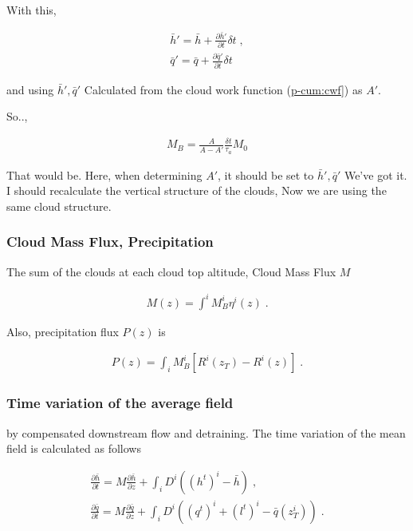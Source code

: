 With this,

\begin{eqnarray}
  \bar{h}'  =  \bar{h} + \frac{\partial \bar{h}'}{\partial t} \delta t \; , \\
  \bar{q}'  =  \bar{q} + \frac{\partial \bar{q}'}{\partial t} \delta t 
\end{eqnarray}

and using \(\bar{h}', \bar{q}'\) Calculated from the cloud work function
(\protect\hyperlink{p-cum:cwf}{p-cum:cwf{]}}) as \(A'\).

So..,

\begin{eqnarray}
  M_B = \frac{A}{A-A'} \frac{\delta t}{\tau_a} M_0 
\end{eqnarray}

That would be. Here, when determining \(A'\), it should be set to
\(\bar{h}', \bar{q}'\) We've got it. I should recalculate the vertical
structure of the clouds, Now we are using the same cloud structure.

\hypertarget{cloud-mass-flux-precipitation}{%
\subsubsection{Cloud Mass Flux,
Precipitation}\label{cloud-mass-flux-precipitation}}

The sum of the clouds at each cloud top altitude, Cloud Mass Flux \(M\)

\begin{eqnarray}
  M(z)   = \int^i M_B^i \eta^i(z) \; .
\end{eqnarray}

Also, precipitation flux \(P(z)\) is

\begin{eqnarray}
 P(z) = \int_i M_B^i \left[ R^i(z_T)-R^i(z) \right]  \; .
\end{eqnarray}

\hypertarget{time-variation-of-the-average-field}{%
\subsubsection{Time variation of the average
field}\label{time-variation-of-the-average-field}}

by compensated downstream flow and detraining. The time variation of the
mean field is calculated as follows

\begin{eqnarray}
  \frac{\partial \bar{h}}{\partial t}  =  M \frac{\partial \bar{h}}{\partial z} 
                    + \int_i D^i ( (h^t)^i - \bar{h} ) \; , \\
  \frac{\partial \bar{q}}{\partial t}  =  M\frac{\partial \bar{q}}{\partial z} 
                    + \int_i D^i ( (q^t)^i + (l^t)^i - \bar{q}(z_T^i) ) \; .
\end{eqnarray}

